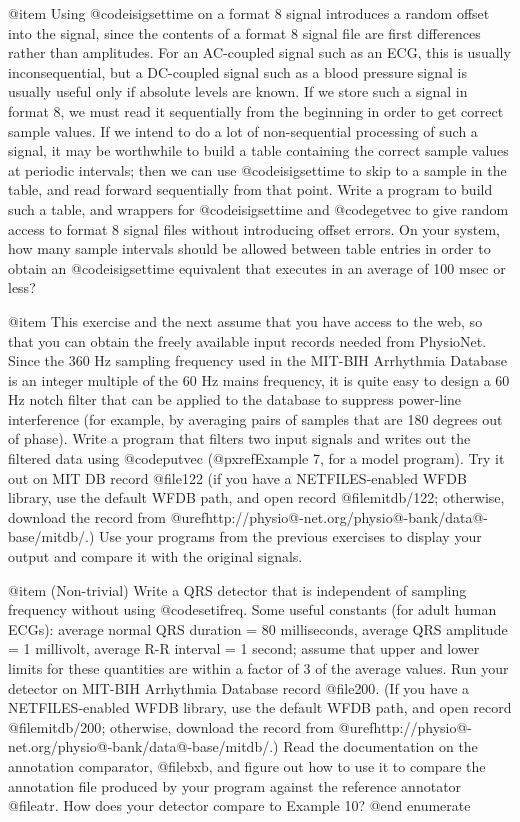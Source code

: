 {{{{{{{{@item
Using @code{isigsettime} on a format 8 signal introduces a random offset
into the signal, since the contents of a format 8 signal file are first
differences rather than amplitudes.  For an AC-coupled signal such as an
ECG, this is usually inconsequential, but a DC-coupled signal such as a
blood pressure signal is usually useful only if absolute levels are
known.  If we store such a signal in format 8, we must read it
sequentially from the beginning in order to get correct sample values.
If we intend to do a lot of non-sequential processing of such a signal,
it may be worthwhile to build a table containing the correct sample
values at periodic intervals; then we can use @code{isigsettime} to
skip to a sample in the table, and read forward sequentially from that
point.  Write a program to build such a table, and wrappers for
@code{isigsettime} and @code{getvec} to give random access to format 8
signal files without introducing offset errors.  On your system, how
many sample intervals should be allowed between table entries in order
to obtain an @code{isigsettime} equivalent that executes in an average
of 100 msec or less?

@item
This exercise and the next assume that you have access to the web, so
that you can obtain the freely available input records needed from PhysioNet.
Since the 360 Hz sampling frequency used in the MIT-BIH Arrhythmia
Database is an integer multiple of the 60 Hz mains frequency, it is
quite easy to design a 60 Hz notch filter that can be applied to the
database to suppress power-line interference (for example, by
averaging pairs of samples that are 180 degrees out of phase).  Write
a program that filters two input signals and writes out the filtered
data using @code{putvec} (@pxref{Example 7}, for a model program).
Try it out on MIT DB record @file{122} (if you have a NETFILES-enabled
WFDB library, use the default WFDB path, and open record
@file{mitdb/122}; otherwise, download the record from
@uref{http://physio@-net.org/physio@-bank/data@-base/mitdb/}.)
Use your programs from the previous exercises to display your output
and compare it with the original signals.

@item
(Non-trivial) Write a QRS detector that is independent of sampling
frequency without using @code{setifreq}.  Some useful constants (for
adult human ECGs): average normal QRS duration = 80 milliseconds,
average QRS amplitude = 1 millivolt, average R-R interval = 1 second;
assume that upper and lower limits for these quantities are within a
factor of 3 of the average values.  Run your detector on MIT-BIH
Arrhythmia Database record @file{200}.  (If you have a
NETFILES-enabled WFDB library, use the default WFDB path, and open
record @file{mitdb/200}; otherwise, download the record from
@uref{http://physio@-net.org/physio@-bank/data@-base/mitdb/}.)
Read the documentation on the annotation comparator, @file{bxb}, and
figure out how to use it to compare the annotation file produced by
your program against the reference annotator @file{atr}.  How does
your detector compare to Example 10?
@end enumerate

}}}}}}}}
